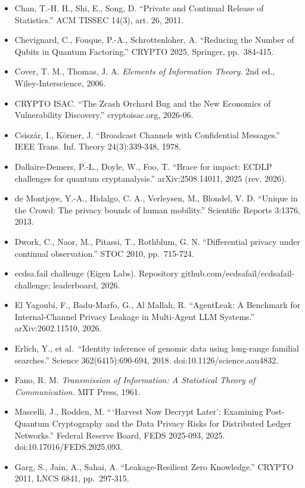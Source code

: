\documentclass[
]{llncs}
\begin{document}
\begin{itemize}
  2026-06.
\item
  Chan, T.-H. H., Shi, E., Song, D. ``Private and Continual Release of
  Statistics.'' ACM TISSEC 14(3), art. 26, 2011.
\item
  Chevignard, C., Fouque, P.-A., Schrottenloher, A. ``Reducing the
  Number of Qubits in Quantum Factoring.'' CRYPTO 2025, Springer,
  pp.~384-415.
\item
  Cover, T. M., Thomas, J. A. \emph{Elements of Information Theory.} 2nd
  ed., Wiley-Interscience, 2006.
\item
  CRYPTO ISAC. ``The Zcash Orchard Bug and the New Economics of
  Vulnerability Discovery.'' cryptoisac.org, 2026-06.
\item
  Csiszár, I., Körner, J. ``Broadcast Channels with Confidential
  Messages.'' IEEE Trans. Inf. Theory 24(3):339-348, 1978.
\item
  Dallaire-Demers, P.-L., Doyle, W., Foo, T. ``Brace for impact: ECDLP
  challenges for quantum cryptanalysis.'' arXiv:2508.14011, 2025 (rev.
  2026).
\item
  de Montjoye, Y.-A., Hidalgo, C. A., Verleysen, M., Blondel, V. D.
  ``Unique in the Crowd: The privacy bounds of human mobility.''
  Scientific Reports 3:1376, 2013.
\item
  Dwork, C., Naor, M., Pitassi, T., Rothblum, G. N. ``Differential
  privacy under continual observation.'' STOC 2010, pp.~715-724.
\item
  ecdsa.fail challenge (Eigen Labs). Repository
  github.com/ecdsafail/ecdsafail-challenge; leaderboard, 2026.
\item
  El Yagoubi, F., Badu-Marfo, G., Al Mallah, R. ``AgentLeak: A Benchmark
  for Internal-Channel Privacy Leakage in Multi-Agent LLM Systems.''
  arXiv:2602.11510, 2026.
\item
  Erlich, Y., et al.~``Identity inference of genomic data using
  long-range familial searches.'' Science 362(6415):690-694, 2018.
  doi:10.1126/science.aau4832.
\item
  Fano, R. M. \emph{Transmission of Information: A Statistical Theory of
  Communication.} MIT Press, 1961.
\item
  Mascelli, J., Rodden, M. ``\,`Harvest Now Decrypt Later': Examining
  Post-Quantum Cryptography and the Data Privacy Risks for Distributed
  Ledger Networks.'' Federal Reserve Board, FEDS 2025-093, 2025.
  doi:10.17016/FEDS.2025.093.
\item
  Garg, S., Jain, A., Sahai, A. ``Leakage-Resilient Zero Knowledge.''
  CRYPTO 2011, LNCS 6841, pp.~297-315.

\end{itemize}
\end{document}
